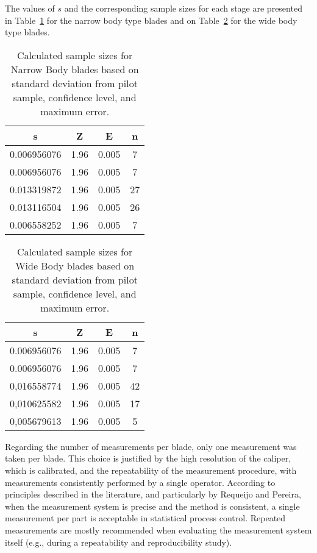 The values of \(s\) and the corresponding sample sizes for each stage are presented in Table~\ref{tab:sample_sizes_data} for the narrow body type blades and on Table~\ref{tab:sample_sizes_data_wide} for the wide body type blades.

\begin{table}[H]
    \centering
    \caption{Calculated sample sizes for Narrow Body blades based on standard deviation from pilot sample, confidence level, and maximum error.}
    \label{tab:sample_sizes_data}
    \begin{tabular}{cccc}
        \hline
        \textbf{s} & \textbf{Z} & \textbf{E} & \textbf{n} \\
        \hline
        0.006956076 & 1.96 & 0.005 & 7 \\
        0.006956076 & 1.96 & 0.005 & 7 \\
        0.013319872 & 1.96 & 0.005 & 27 \\
        0.013116504 & 1.96 & 0.005 & 26 \\
        0.006558252 & 1.96 & 0.005 & 7 \\
        \hline
    \end{tabular}
\end{table}

\begin{table}[H]
    \centering
    \caption{Calculated sample sizes for Wide Body blades based on standard deviation from pilot sample, confidence level, and maximum error.}
    \label{tab:sample_sizes_data_wide}
    \begin{tabular}{cccc}
        \hline
        \textbf{s} & \textbf{Z} & \textbf{E} & \textbf{n} \\
        \hline
        0.006956076 & 1.96 & 0.005 & 7 \\
        0.006956076 & 1.96 & 0.005 & 7 \\
        0,016558774 & 1.96 & 0.005 & 42 \\
        0,010625582 & 1.96 & 0.005 & 17 \\
        0,005679613 & 1.96 & 0.005 & 5 \\
        \hline
    \end{tabular}
\end{table}


Regarding the number of measurements per blade, only one measurement was taken per blade. 
This choice is justified by the high resolution of the caliper, which is calibrated, and the repeatability of the measurement procedure, with measurements consistently performed by a single operator. 
According to principles described in the literature, and particularly by Requeijo and Pereira, when the measurement system is precise and the method is consistent, a single measurement per part is acceptable in statistical process control. 
Repeated measurements are mostly recommended when evaluating the measurement system itself (e.g., during a repeatability and reproducibility study).


